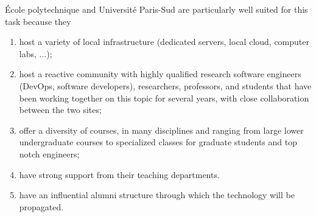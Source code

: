 \begin{task}[
  title=Demonstrator: enriched teaching with Jupyter,
  id=teaching,
  lead=EP,
  PM=6, %
  wphases={0-48},
  partners={EGI,UIO,UPSUD,XFEL}
  ]
  \'Ecole polytechnique and Université Paris-Sud are particularly well
  suited for this task because they
  \begin{enumerate}
  \item host a variety of local infrastructure (dedicated servers,
    local cloud, computer labs, ...);
  \item host a reactive community with highly qualified research
    software engineers (DevOps, software developers), researchers,
    professors, and students that have been working together on this
    topic for several years, with close collaboration between the two
    sites;
  \item offer a diversity of courses, in many disciplines and ranging
    from large lower undergraduate courses to specialized classes for
    graduate students and top notch engineers;
  \item have strong support from their teaching departments.
  \item have an influential alumni structure through which the
    technology will be propagated.
  \end{enumerate}




\end{task}
